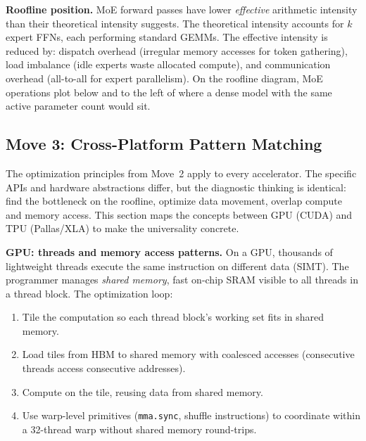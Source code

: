 \textbf{Roofline position.} MoE forward passes have lower \textit{effective} arithmetic intensity than their theoretical intensity suggests. The theoretical intensity accounts for $k$ expert FFNs, each performing standard GEMMs. The effective intensity is reduced by: dispatch overhead (irregular memory accesses for token gathering), load imbalance (idle experts waste allocated compute), and communication overhead (all-to-all for expert parallelism). On the roofline diagram, MoE operations plot below and to the left of where a dense model with the same active parameter count would sit.

\subsection*{Move 3: Cross-Platform Pattern Matching}

The optimization principles from Move~2 apply to every accelerator. The specific APIs and hardware abstractions differ, but the diagnostic thinking is identical: find the bottleneck on the roofline, optimize data movement, overlap compute and memory access. This section maps the concepts between GPU (CUDA) and TPU (Pallas/XLA) to make the universality concrete.

\textbf{GPU: threads and memory access patterns.} On a GPU, thousands of lightweight threads execute the same instruction on different data (SIMT). The programmer manages \textit{shared memory}, fast on-chip SRAM visible to all threads in a thread block. The optimization loop:
\begin{enumerate}
  \item Tile the computation so each thread block's working set fits in shared memory.
  \item Load tiles from HBM to shared memory with coalesced accesses (consecutive threads access consecutive addresses).
  \item Compute on the tile, reusing data from shared memory.
  \item Use warp-level primitives (\texttt{mma.sync}, shuffle instructions) to coordinate within a 32-thread warp without shared memory round-trips.
\end{enumerate}

